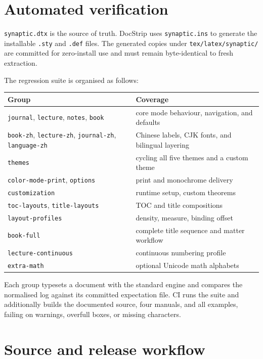 \documentclass[a4paper,11pt]{scrartcl}
\begin{document}
\section{Automated verification}

\texttt{synaptic.dtx} is the source of truth. DocStrip uses
\texttt{synaptic.ins} to generate the installable \texttt{.sty} and
\texttt{.def} files. The generated copies under
\texttt{tex/latex/synaptic/} are committed for zero-install use and must remain
byte-identical to fresh extraction.

The regression suite is organised as follows:

{\setlength{\parindent}{0pt}\noindent\begin{tabularx}{\textwidth}{@{}l Y@{}}
  \toprule
  \textbf{Group} & \textbf{Coverage} \\
  \midrule
  \texttt{journal}, \texttt{lecture}, \texttt{notes}, \texttt{book} & core
  mode behaviour, navigation, and defaults \\
  \texttt{book-zh}, \texttt{lecture-zh}, \texttt{journal-zh},
  \texttt{language-zh} & Chinese labels, CJK fonts, and bilingual layering \\
  \texttt{themes} & cycling all five themes and a custom theme \\
  \texttt{color-mode-print}, \texttt{options} & print and monochrome delivery \\
  \texttt{customization} & runtime setup, custom theorems \\
  \texttt{toc-layouts}, \texttt{title-layouts} & TOC and title compositions \\
  \texttt{layout-profiles} & density, measure, binding offset \\
  \texttt{book-full} & complete title sequence and matter workflow \\
  \texttt{lecture-continuous} & continuous numbering profile \\
  \texttt{extra-math} & optional Unicode math alphabets \\
  \bottomrule
\end{tabularx}}

Each group typesets a document with the standard engine and compares the
normalised log against its committed expectation file. CI runs the suite and
additionally builds the documented source, four manuals, and all examples,
failing on warnings, overfull boxes, or missing characters.

\section{Source and release workflow}
\end{document}
